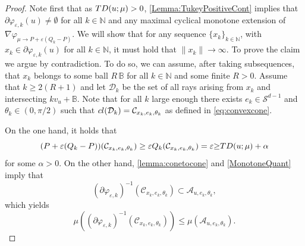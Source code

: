 \documentclass[10pt,a4paper]{amsart}
\newcommand{\N}{\mathbb{N}}
\newcommand{\eps}{\varepsilon}
\begin{document}
\begin{proof}
%
Note first that as ${\rm TD}(u;\mu)>0$, \autoref{Lemma:TukeyPositiveCont} implies that $ \partial\varphi_{\eps,k}(u) \neq \emptyset$ for all $k\in \N$ and  any maximal {  cyclical} monotone extension of $\nabla \varphi_{\mu\to P+\eps (Q_k-P)}$. 
We will show that for any sequence $
\{x_k\}_{k\in \N}$, with 
$ x_k \in \partial\varphi_{\eps,k}(u)$
for all $k\in \N$, it must hold that $ \|x_k\| \to \infty.$ 
To prove the claim we argue by contradiction. To do so, we can assume, after taking subsequences, that $x_k$ belongs to some ball $R\,\mathbb{B}$ for all $k\in \N$ and some finite $R>0$. %
Assume that $k\geq  2 (R+1) $ and let 
$ \mathcal{D}_k $ be the set of all rays arising from $ x_k $ and  {intersecting} $k v_u+\mathbb{B}$. Note that for all $k$ large enough there exists $e_k\in \mathcal{S}^{d-1}$ and $\theta_k\in (0,\pi/2)$ such that  $ {{\rm cl}}(\mathcal{D}_k) =\mathcal{C}_{x_k,e_k,\theta_k}$ as defined  in \eqref{eq:convexcone}.

On the one hand, it holds that  
\begin{equation}
    \label{eq:ToContradictlowerbound1}
    (P+\eps (Q_{k}-P))(\mathcal{C}_{x_k,e_k,\theta_k})\geq  \eps Q_{k}(\mathcal{C}_{x_k,e_k,\theta_k})= \eps  {\geq } {\rm TD}(u;\mu)+\alpha
\end{equation}
for some $\alpha>0$. On the other hand, \autoref{lemma:conetocone}  and \eqref{MonotoneQuant} imply that 
$$ (\partial \varphi_{\eps,k})^{-1}(\mathcal{C}_{x_k,e_k,\theta_k})\subset \mathcal{A}_{u,e_k,\theta_k}, $$
which yields
\begin{equation}
    \label{eq:ToContradictlowerbound2}
    \mu((\partial \varphi_{\eps,k})^{-1}(\mathcal{C}_{x_k,e_k,\theta_k})) {\leq } \mu(\mathcal{A}_{u,e_k,\theta_k}).
\end{equation}


\end{proof}
\end{document}
